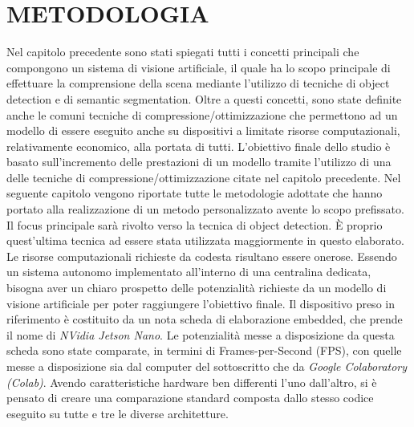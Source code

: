 
\chapter{METODOLOGIA}
\label{Capitolo3}
\thispagestyle{empty}


Nel capitolo precedente sono stati spiegati tutti i concetti principali che 
compongono un sistema di visione artificiale, il quale ha lo scopo principale 
di effettuare la comprensione della scena mediante l'utilizzo di tecniche di 
object detection e di semantic segmentation. Oltre a questi concetti, sono 
state definite anche le comuni tecniche di compressione/ottimizzazione che 
permettono ad un modello di essere eseguito anche su dispositivi a limitate 
risorse computazionali, relativamente economico, alla portata di tutti. 
L'obiettivo finale dello studio è basato sull'incremento delle prestazioni di 
un modello tramite l'utilizzo di una delle tecniche di compressione/ottimizzazione 
citate nel capitolo precedente. Nel seguente capitolo vengono 
riportate tutte le metodologie adottate che hanno portato alla realizzazione 
di un metodo personalizzato avente lo scopo prefissato. Il focus principale 
sarà rivolto verso la tecnica di object detection. È proprio quest'ultima 
tecnica ad essere stata utilizzata maggiormente in questo elaborato. Le
risorse computazionali richieste da codesta risultano essere onerose. Essendo 
un sistema autonomo implementato all'interno di una centralina dedicata, 
bisogna aver un chiaro prospetto delle potenzialità richieste da un modello di 
visione artificiale per poter raggiungere l'obiettivo finale. Il dispositivo preso 
in riferimento è costituito da un nota scheda di elaborazione embedded, che 
prende il nome di \emph{NVidia Jetson Nano}. Le potenzialità messe a disposizione 
da questa scheda sono state comparate, in termini di Frames-per-Second 
(FPS), con quelle messe a disposizione sia dal computer del sottoscritto 
che da \emph{Google Colaboratory (Colab)}. Avendo caratteristiche hardware ben 
differenti l'uno dall'altro, si è pensato di creare una comparazione standard 
composta dallo stesso codice eseguito su tutte e tre le diverse architetture. 
